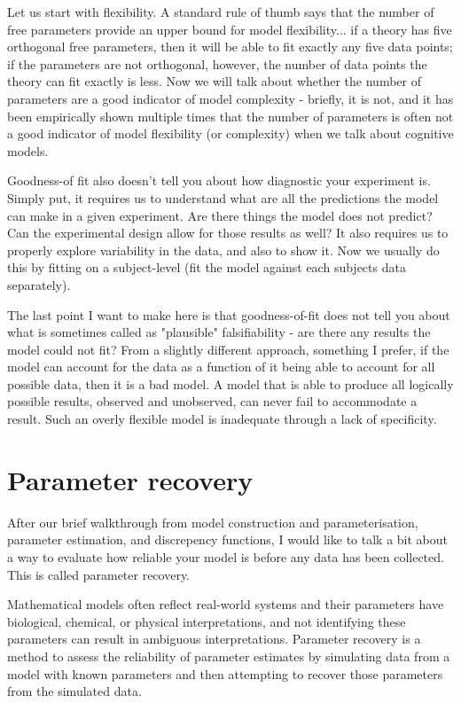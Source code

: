 \documentclass[12pt]{article}
\begin{document}
Let us start with flexibility. A standard rule of thumb says that the number of free parameters provide an upper bound for model flexibility... if a theory has five orthogonal free parameters, then it will be able to fit exactly any five data points; if the parameters are not orthogonal, however, the number of data points the theory can fit exactly is less. Now we will talk about whether the number of parameters are a good indicator of model complexity - briefly, it is not, and it has been empirically shown multiple times that the number of parameters is often not a good indicator of model flexibility (or complexity) when we talk about cognitive models. 

Goodness-of fit also doesn't tell you about how diagnostic your experiment is. Simply put, it requires us to understand what are all the predictions the model can make in a given experiment. Are there things the model does not predict? Can the experimental design allow for those results as well? It also requires us to properly explore variability in the data, and also to show it. Now we usually do this by fitting on a subject-level (fit the model against each subjects data separately).

The last point I want to make here is that goodness-of-fit does not tell you about what is sometimes called as "plausible" falsifiability - are there any results the model could not fit? From a slightly different approach, something I prefer, if the model can account for the data as a function of it being able to account for all possible data, then it is a bad model. A model that is able to produce all logically possible results, observed and unobserved, can never fail to accommodate a result. Such an overly flexible model is inadequate through a lack of specificity.

\section{Parameter recovery}

After our brief walkthrough from model construction and parameterisation, parameter estimation, and discrepency functions, I would like to talk a bit about a way to evaluate how reliable your model is before any data has been collected. This is called parameter recovery.

Mathematical models often reflect real-world systems and their parameters have biological, chemical, or physical interpretations, and not identifying these parameters can result in ambiguous interpretations. Parameter recovery is a method to assess the reliability of parameter estimates by simulating data from a model with known parameters and then attempting to recover those parameters from the simulated data.
\end{document}
